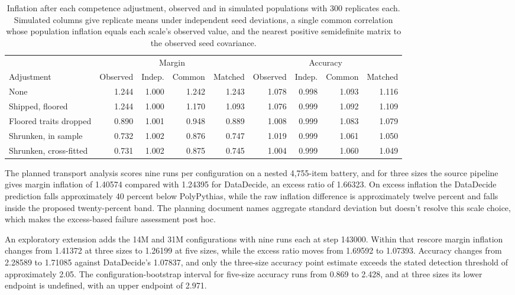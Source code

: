 \begin{table}[h]
\centering
\small
\caption{Inflation after each competence adjustment, observed and in simulated populations with 300 replicates each. Simulated columns give replicate means under independent seed deviations, a single common correlation whose population inflation equals each scale's observed value, and the nearest positive semidefinite matrix to the observed seed covariance.}
\label{tab:proxy}
\setlength{\tabcolsep}{3pt}
\begin{tabular}{lrrrrrrrr}
\toprule
& \multicolumn{4}{c}{Margin} & \multicolumn{4}{c}{Accuracy} \\
\cmidrule(lr){2-5}\cmidrule(lr){6-9}
Adjustment & Observed & Indep. & Common & Matched & Observed & Indep. & Common & Matched \\
\midrule
None & 1.244 & 1.000 & 1.242 & 1.243 & 1.078 & 0.998 & 1.093 & 1.116 \\
Shipped, floored & 1.244 & 1.000 & 1.170 & 1.093 & 1.076 & 0.999 & 1.092 & 1.109 \\
Floored traits dropped & 0.890 & 1.001 & 0.948 & 0.889 & 1.008 & 0.999 & 1.083 & 1.079 \\
Shrunken, in sample & 0.732 & 1.002 & 0.876 & 0.747 & 1.019 & 0.999 & 1.061 & 1.050 \\
Shrunken, cross-fitted & 0.731 & 1.002 & 0.875 & 0.745 & 1.004 & 0.999 & 1.060 & 1.049 \\
\bottomrule
\end{tabular}
\end{table}
\label{app:transport}
The planned transport analysis scores nine runs per configuration on a nested 4,755-item battery, and for three sizes the source pipeline gives margin inflation of 1.40574 compared with 1.24395 for DataDecide, an excess ratio of 1.66323. On excess inflation the DataDecide prediction falls approximately 40 percent below PolyPythias, while the raw inflation difference is approximately twelve percent and falls inside the proposed twenty-percent band. The planning document names aggregate standard deviation but doesn't resolve this scale choice, which makes the excess-based failure assessment post hoc.

An exploratory extension adds the 14M and 31M configurations with nine runs each at step 143000. Within that rescore margin inflation changes from 1.41372 at three sizes to 1.26199 at five sizes, while the excess ratio moves from 1.69592 to 1.07393. Accuracy changes from 2.28589 to 1.71085 against DataDecide's 1.07837, and only the three-size accuracy point estimate exceeds the stated detection threshold of approximately 2.05. The configuration-bootstrap interval for five-size accuracy runs from 0.869 to 2.428, and at three sizes its lower endpoint is undefined, with an upper endpoint of 2.971.

